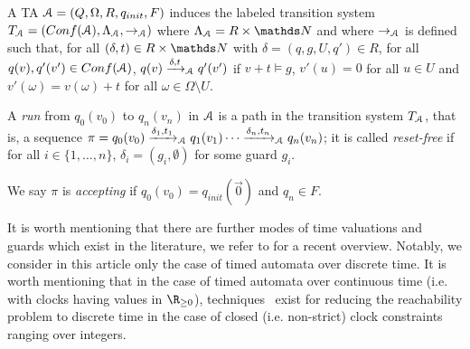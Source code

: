 \begin{samepage}
A TA $\mathcal{A}=(Q,\Omega,R,q_{init},F)$ induces the labeled transition system 
$T_{\A} =  (\Conf(\A), \Lambda_{\A}, \rightarrow_{\A})$
where $ \Lambda_{\A} = R \times \N $
and 
where $ \rightarrow_{\mathcal{A}}$ is defined such that, 
for all $(\delta,t)\in R\times\N$ with  	$\delta = (q,g,U,q')\in R$,
for all $q(v), q'(v') \in \Conf(\A)$,
$q(v)\xrightarrow{\delta,t}_{\mathcal{A}} q'(v')$ if
	$v+t\models g$, 
	 $v'(u)=0$ for all $u \in U$ and $v'(\omega)=v(\omega)+t$ for all 
	$\omega \in \Omega \setminus U$.
\end{samepage}

A {\em run} from $q_0(v_0)$ to $q_n(v_n)$ in $\A$ is a path in the transition system $T_{\mathcal{A}}$, that is,
a sequence 
$\pi = q_0(v_0)\xrightarrow{\delta_1,t_1}_{\mathcal{A}}q_1(v_1)\cdots\xrightarrow{\delta_n,t_n}_{\mathcal{A}}q_n(v_n)$;
it is called {\em reset-free} if for all $i \in \{1,\ldots,n\}$,
 $\delta_i = (g_i,\emptyset)$ for some guard $g_i$.


We say $\pi$ is {\em accepting} if $q_0(v_0) = q_{init}(\vec{0})$ and $q_n \in F$. 
\iffalse
We say {\em reachability holds} for the TA $\A$ 
if there exists an accepting run. %
\fi


It is worth mentioning that there are further modes of time valuations and guards which exist in the literature, we refer
to \cite{Andre19} for a recent overview. 
%
Notably, we consider in this article only the case of timed automata over discrete time. It is worth mentioning that in
the case of timed automata over continuous time (i.e. with clocks having values in $\R_{\geq 0}$),
techniques~\cite{HenzingerMP92,OuaknineW03} exist for reducing the reachability problem to discrete time in the case of closed (i.e. non-strict) clock constraints ranging over integers. \\




